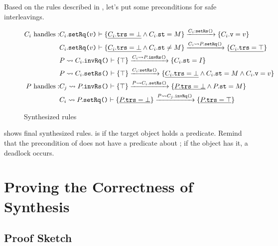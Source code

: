 \documentclass[format=manuscript]{acmart}
\begin{document}
Based on the rules described in , let's put
some preconditions for safe interleavings.

\begin{figure}[h]
  \begin{eqnarray*}
    C_i\ \textrm{handles}: &
    C_i.\texttt{setRq(}v\texttt{)}\vdash \{ \underline{C_i.\texttt{trs} = \bot{}} \wedge C_i.\texttt{st} = M \} \xrightarrow{C_i:\texttt{setRs()}} \{ C_i.\texttt{v} = v \} \\
    & C_i.\texttt{setRq(}v\texttt{)}\vdash \{ \underline{C_i.\texttt{trs} = \bot{}} \wedge C_i.\texttt{st} \neq M \} \xrightarrow{C_i \leadsto P.\texttt{setRq()}} \{ \underline{C_i.\texttt{trs} = \top{}} \} \\
    & P \leadsto C_i.\texttt{invRq()}\vdash \{ \top \} \xrightarrow{C_i \leadsto P.\texttt{invRs()}} \{ C_i.\texttt{st} = I \} \\
    & P \leadsto C_i.\texttt{setRs()}\vdash \{ \top \} \xrightarrow{C_i:\texttt{setRs()}} \{ \underline{C_i.\texttt{trs} = \bot{}} \wedge C_i.\texttt{st} = M \wedge C_i.\texttt{v} = v \} \\
    P\ \textrm{handles}: &
    C_j \leadsto P.\texttt{invRs()}\vdash \{ \top \} \xrightarrow{P \leadsto C_i.\texttt{setRs()}} \{ \underline{P.\texttt{trs} = \bot{}} \wedge P.\texttt{st} = M \} \\
    & C_i \leadsto P.\texttt{setRq()}\vdash \{ \underline{P.\texttt{trs} = \bot{}} \} \xrightarrow{P \leadsto C_j.\texttt{invRq()}} \{ \underline{P.\texttt{trs} = \top{}} \} \\
  \end{eqnarray*}
  \caption{Synthesized rules}
  \label{fig:synthesized-rules}
\end{figure}

 shows final synthesized rules. \trsOf{\cdot} is
\trsYes{} if the target object holds a predicate. Remind that the precondition
of  does not have a predicate about ; if the object
has it, a deadlock occurs.

\fi %

\section{Proving the Correctness of Synthesis}

\subsection{Proof Sketch}
\end{document}

